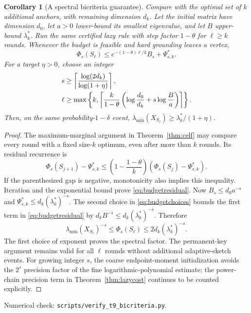 \documentclass[11pt]{article}
\newtheorem{corollary}[theorem]{Corollary}
\begin{document}
\begin{corollary}[A spectral bicriteria guarantee]\label{cor:spectralbudget}
Compare with the optimal set of $k$ additional anchors, with
remaining dimension $d_k$. Let the initial matrix have dimension
$d_0$, let $a>0$ lower-bound its smallest eigenvalue, and let
$B$ upper-bound $\lambda_k^*$. Run the same certified lazy rule
with step factor $1-\theta$ for $\ell\geq k$ rounds.
Whenever the budget is feasible and hard grounding leaves a vertex,
\begin{equation}\label{eq:budgetresidual}
 \Phi_s(S_\ell)
 \leq e^{-(1-\theta)\ell/k}B_s+\Psi_{s,k}^*.
\end{equation}
For a target $\eta>0$, choose an integer
\begin{align}
 s&\geq\left\lceil\frac{\log(2d_k)}{\log(1+\eta)}\right\rceil,
 \label{eq:budgetchoices}\\
 \ell&\geq\max\left\{k,
 \left\lceil\frac{k}{1-\theta}
       \left(\log\frac{d_0}{d_k}+s\log\frac Ba\right)\right\rceil
              \right\}.\notag
\end{align}
Then, on the same probability-$1-\delta$ event,
$\lambda_{\min}(X_{S_\ell})\geq\lambda_k^*/(1+\eta)$.
\end{corollary}
\begin{proof}
The maximum-marginal argument in Theorem~\ref{thm:celf} may
compare every round with a fixed size-$k$ optimum, even after
more than $k$ rounds. Its residual recurrence is
\[
 \Phi_s(S_{j+1})-\Psi_{s,k}^*
 \leq\left(1-\frac{1-\theta}{k}\right)
               (\Phi_s(S_j)-\Psi_{s,k}^*).
\]
If the parenthesized gap is negative, monotonicity also implies
this inequality. Iteration and the exponential bound prove
\eqref{eq:budgetresidual}. Now $B_s\leq d_0a^{-s}$ and
$\Psi_{s,k}^*\leq d_k(\lambda_k^*)^{-s}$.
The second choice in \eqref{eq:budgetchoices} bounds the first
term in \eqref{eq:budgetresidual} by
$d_k B^{-s}\leq d_k(\lambda_k^*)^{-s}$. Therefore
\[
 \lambda_{\min}(X_{S_\ell})^{-s}
 \leq\Phi_s(S_\ell)\leq2d_k(\lambda_k^*)^{-s}.
\]
The first choice of exponent proves the spectral factor.
The permanent-key argument remains valid for all $\ell$ rounds
without additional adaptive-sketch events. For growing integer
$s$, the coarse endpoint-moment initialization avoids the
$2^s$ precision factor of the fine logarithmic-polynomial estimate;
the power-chain precision term in Theorem~\ref{thm:lazycost}
continues to be counted explicitly.
\end{proof}
\noindent Numerical check: \texttt{scripts/verify\_t9\_bicriteria.py}.
\end{document}
